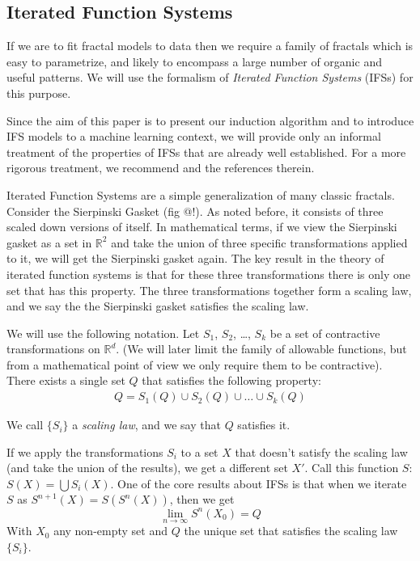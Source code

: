 \documentclass[10pt,a4paper,oneside]{article}
\theoremstyle{definition}
\begin{document}
\subsection*{Iterated Function Systems}

If we are to fit fractal models to data then we require a family of fractals which is easy to parametrize, and likely to encompass a large number of organic and useful patterns. We will use the formalism of \emph{Iterated Function Systems} (IFSs) for this purpose. 

Since the aim of this paper is to present our induction algorithm and to introduce IFS models to a machine learning context, we will provide only an informal treatment of the properties of IFSs that are already well established. For a more rigorous treatment, we recommend \cite{hutchinson2000deterministic} and the references therein.

Iterated Function Systems are a simple generalization of many classic fractals. Consider the Sierpinski Gasket (fig @!). As noted before, it consists of three scaled down versions of itself. In mathematical terms, if we view the Sierpinski gasket as a set in ${\mathbb R}^2$ and take the union of three specific transformations applied to it, we will get the Sierpinski gasket again. The key result in the theory of iterated function systems is that for these three transformations there is only one set that has this property. The three transformations together form a scaling law, and we say the the Sierpinski gasket satisfies the scaling law.

We will use the following notation. Let $S_1$, $S_2$, \ldots, $S_k$ be a set of contractive transformations on ${\mathbb R}^d$. (We will later limit the family of allowable functions, but from a mathematical point of view we only require them to be contractive). There exists a single set $Q$ that satisfies the following property:
\begin{align}
Q = S_1(Q) \cup S_2(Q) \cup \ldots \cup S_k(Q) \label{scaling law}
\end{align}

We call $\{S_i\}$ a \textit{scaling law}, and we say that $Q$ satisfies it.
 
If we apply the transformations $S_i$ to a set $X$ that doesn't satisfy the scaling law (and take the union of the results), we get a different set $X'$. Call this function $S$: $S(X) = \bigcup S_i(X)$. One of the core results about IFSs is that when we iterate $S$ as $S^{n+1}(X) = S(S^n(X))$, then we get 
\[
\lim_{n \rightarrow \infty} S^n(X_0) = Q
\]
With $X_0$ any non-empty set and $Q$ the unique set that satisfies the scaling law $\{S_i\}$.
\end{document}
